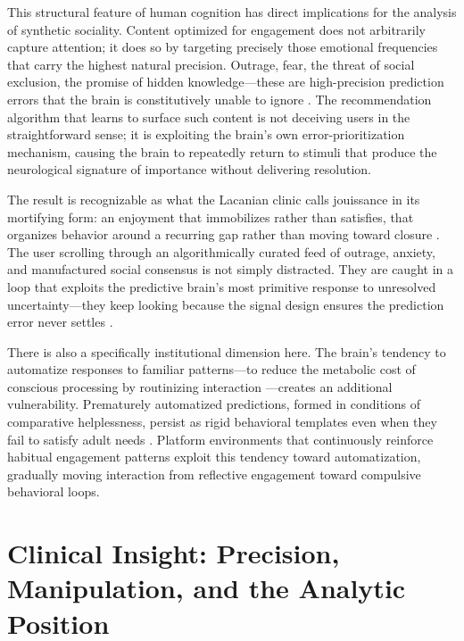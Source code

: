 \documentclass[12pt,a4paper]{article}
\begin{document}
This structural feature of human cognition has direct implications for the analysis of synthetic
sociality. Content optimized for engagement does not arbitrarily capture attention; it does so
by targeting precisely those emotional frequencies that carry the highest natural precision.
Outrage, fear, the threat of social exclusion, the promise of hidden knowledge---these are
high-precision prediction errors that the brain is constitutively unable to ignore
\citep{vosoughi2018,friston2013}. The recommendation algorithm that learns to surface such
content is not deceiving users in the straightforward sense; it is exploiting the brain's own
error-prioritization mechanism, causing the brain to repeatedly return to stimuli that produce
the neurological signature of importance without delivering resolution.

The result is recognizable as what the Lacanian clinic calls jouissance in its mortifying form:
an enjoyment that immobilizes rather than satisfies, that organizes behavior around a recurring
gap rather than moving toward closure \citep{dallaglio2024}. The user scrolling through an
algorithmically curated feed of outrage, anxiety, and manufactured social consensus is not simply
distracted. They are caught in a loop that exploits the predictive brain's most primitive
response to unresolved uncertainty---they keep looking because the signal design ensures the
prediction error never settles \citep{friston2010,vosoughi2018}.

There is also a specifically institutional dimension here. The brain's tendency to automatize
responses to familiar patterns---to reduce the metabolic cost of conscious processing by
routinizing interaction \citep{solms2021}---creates an additional vulnerability. Prematurely
automatized predictions, formed in conditions of comparative helplessness, persist as rigid
behavioral templates even when they fail to satisfy adult needs \citep{dallaglio2024}. Platform
environments that continuously reinforce habitual engagement patterns exploit this tendency
toward automatization, gradually moving interaction from reflective engagement toward compulsive
behavioral loops.

\section{Clinical Insight: Precision, Manipulation, and the Analytic Position}
\end{document}
